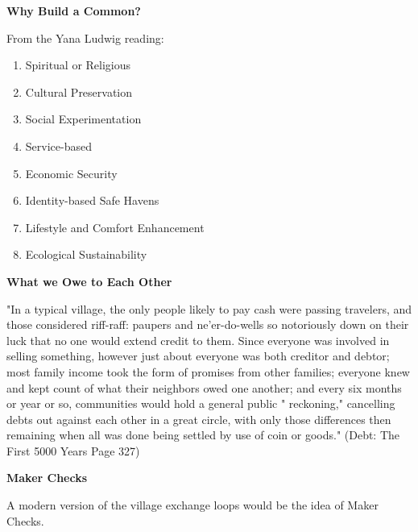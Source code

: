 \documentclass{article}
\begin{document}
\pagebreak
{\huge \textbf{Why Build a Common?}}

From the Yana Ludwig reading:

\begin{enumerate}
	\item Spiritual or Religious
	\item 	Cultural Preservation
	\item 	Social Experimentation
	\item 	Service-based
	\item 	Economic Security
	\item 	Identity-based Safe Havens
	\item 	Lifestyle and Comfort Enhancement
	\item 	Ecological Sustainability
\end{enumerate}


\pagebreak
{\huge \textbf{What we Owe to Each Other}}


"In a typical village, the only people likely to pay cash were passing
travelers, and those considered riff-raff: paupers and ne'er-do-wells so
notoriously down on their luck that no one would extend credit to
them. Since everyone was involved in selling something, however just
about everyone was both creditor and debtor; most family income took
the form of promises from other families; everyone knew and kept
count of what their neighbors owed one another; and every six months
or year or so, communities would hold a general public " reckoning,"
cancelling debts out against each other in a great circle, with only those
differences then remaining when all was done being settled by use of
coin or goods." (Debt: The First 5000 Years Page 327)



\large \textbf{Maker Checks}

A modern version of the village exchange loops would be the idea of Maker Checks. 
\end{document}
